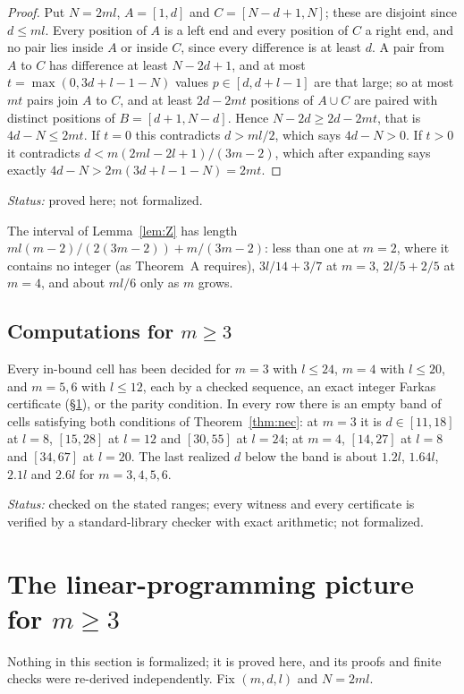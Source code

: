 \documentclass[11pt]{amsart}
\theoremstyle{plain}
\theoremstyle{definition}
\theoremstyle{remark}
\newcommand{\status}[1]{\par\smallskip
  {\small\raggedright\noindent\textit{Status:} #1\par}\smallskip}
\begin{document}
\begin{proof}
Put $N = 2ml$, $A = [1,d]$ and $C = [N-d+1,N]$; these are disjoint since $d \le ml$.
Every position of $A$ is a left end and every position of $C$ a right end, and no pair
lies inside $A$ or inside $C$, since every difference is at least $d$. A pair from $A$ to
$C$ has difference at least $N - 2d + 1$, and at most
$t = \max(0, 3d + l - 1 - N)$ values $p \in [d,d+l-1]$ are that large; so at most $mt$
pairs join $A$ to $C$, and at least $2d - 2mt$ positions of $A \cup C$ are paired with
distinct positions of $B = [d+1,N-d]$. Hence $N - 2d \ge 2d - 2mt$, that is
$4d - N \le 2mt$. If $t = 0$ this contradicts $d > ml/2$, which says $4d - N > 0$. If
$t > 0$ it contradicts $d < m(2ml-2l+1)/(3m-2)$, which after expanding says exactly
$4d - N > 2m(3d+l-1-N) = 2mt$.
\end{proof}
\status{proved here; not formalized.}

The interval of Lemma~\ref{lem:Z} has length
$ml(m-2)/(2(3m-2)) + m/(3m-2)$: less than one at $m = 2$, where it contains no integer
(as Theorem~A requires), $3l/14 + 3/7$ at $m = 3$, $2l/5 + 2/5$ at $m = 4$, and about
$ml/6$ only as $m$ grows.

\subsection*{Computations for \texorpdfstring{$m \ge 3$}{m >= 3}}
Every in-bound cell has been decided for $m = 3$ with $l \le 24$, $m = 4$ with $l \le 20$,
and $m = 5, 6$ with $l \le 12$, each by a checked sequence, an exact integer Farkas
certificate (\S\ref{sec:lp}), or the parity condition. In every row there is an empty
band of cells satisfying both conditions of Theorem~\ref{thm:nec}: at $m = 3$ it is
$d \in [11,18]$ at $l = 8$, $[15,28]$ at $l = 12$ and $[30,55]$ at $l = 24$; at $m = 4$,
$[14,27]$ at $l = 8$ and $[34,67]$ at $l = 20$. The last realized $d$ below the band is
about $1.2l$, $1.64l$, $2.1l$ and $2.6l$ for $m = 3,4,5,6$.
\status{checked on the stated ranges; every witness and every certificate is verified
by a standard-library checker with exact arithmetic; not formalized.}

\section{The linear-programming picture for \texorpdfstring{$m \ge 3$}{m >= 3}}\label{sec:lp}

Nothing in this section is formalized; it is proved here, and its proofs and finite
checks were re-derived independently. Fix $(m,d,l)$ and $N = 2ml$.
\end{document}
